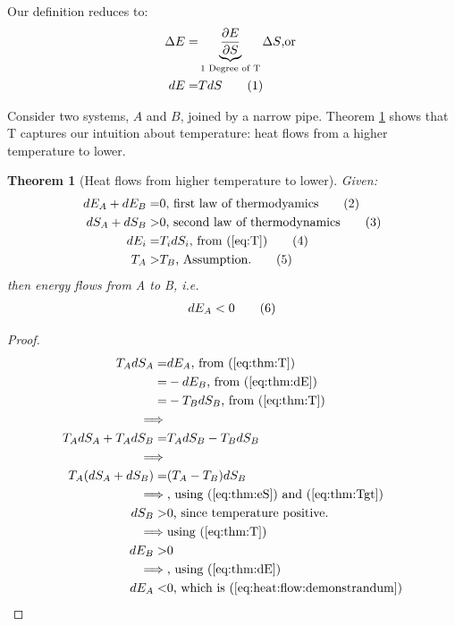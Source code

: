 \documentclass[]{article}
\newcommand\numberthis{\addtocounter{equation}{1}\tag{\theequation}}
\newtheorem{thm}{Theorem}
\begin{document}
 Our definition reduces to:
\begin{align*}
\Delta E =& \underbrace{\frac{\partial E}{\partial S}}_\text{1 Degree of T} \Delta S\text{,or }\\
dE =& T dS \numberthis \label{eq:T}
\end{align*}

Consider two systems, $A$ and $B$, joined by a narrow pipe. Theorem \ref{thm:heat:flow} shows that T captures our intuition about temperature: heat flows from a higher temperature to lower.

\begin{thm}[Heat flows from higher temperature to lower]\label{thm:heat:flow}
	Given:
	\begin{align*}
	dE_A + dE_B =& 0 \text{, first law of thermodyamics}\numberthis \label{eq:thm:dE}\\
	dS_A + dS_B>& 0 \text{, second law of thermodynamics}\numberthis \label{eq:thm:eS} \\
	dE_i =& T_i dS_i \text{, from (\ref {eq:T})} \numberthis \label{eq:thm:T} \\
	T_A>&T_B \text{, Assumption.}\numberthis \label{eq:thm:Tgt}
	\end{align*}
	then energy flows from A to B, i.e.
	\begin{align*}
	dE_A<0\numberthis \label{eq:heat:flow:demonstrandum}
	\end{align*}
\end{thm}
\begin{proof}
	\begin{align*}
	T_A dS_A =& dE_A \text{, from (\ref{eq:thm:T})}\\
	=& - dE_B \text{, from (\ref{eq:thm:dE})}\\
	=& - T_B dS_B  \text{, from (\ref{eq:thm:T})}\\
	\implies&\\
	T_A dS_A + T_A dS_B =& T_A dS_B -T_B dS_B\\
	\implies&\\
	T_A (dS_A + dS_B) =& (T_A  -T_B) dS_B\\
	\implies& \text{, using (\ref{eq:thm:eS}) and (\ref{eq:thm:Tgt})}\\
	dS_B >& 0\text{, since temperature positive.}\\
	\implies& \text{using (\ref{eq:thm:T})}\\
	dE_B >& 0\\
	\implies& \text{, using (\ref{eq:thm:dE})}\\
	dE_A<&0\text{, which is (\ref{eq:heat:flow:demonstrandum})}
	\end{align*}
\end{proof}
\end{document}
